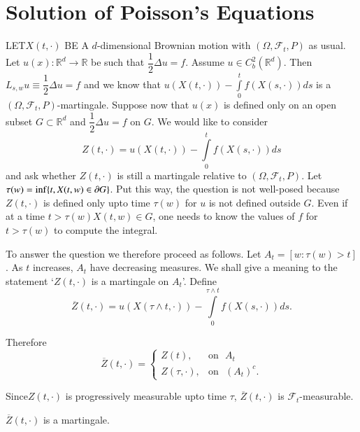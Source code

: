 \chapter{Solution of Poisson's Equations}\label{chap17}

LET\pageoriginale $X(t,\cdot)$ BE A $d$-dimensional Brownian motion
with $(\Omega,\mathscr{F}_{t},P)$ as usual. Let
$u(x):\mathbb{R}^{d}\to \mathbb{R}$ be such that $\dfrac{1}{2}\Delta
u=f$. Assume $u\in C^{2}_{b}(\mathbb{R}^{d})$. Then $L_{s,w}u\equiv
\dfrac{1}{2}\Delta u=f$ and we know that
$u(X(t,\cdot))-\int\limits^{t}_{0}f(X(s,\cdot))ds$ is a
$(\Omega,\mathscr{F}_{t},P)$-martingale. Suppose now that $u(x)$ is
defined only on an open subset $G\subset \mathbb{R}^{d}$ and
$\dfrac{1}{2}\Delta u=f$ on $G$. We would like to consider
$$
Z(t,\cdot)=u(X(t,\cdot))-\int\limits^{t}_{0}f(X(s,\cdot))ds
$$
and ask whether $Z(t,\cdot)$ is still a martingale relative to
$(\Omega,\mathscr{F}_{t},P)$. Let $\tau(w)=\inf\{t,X(t,w)\in \partial
G\}$. Put this way, the question is not well-posed because
$Z(t,\cdot)$ is defined only upto time $\tau(w)$ for $u$ is not
defined outside $G$. Even if at a time $t>\tau(w)X(t,w)\in G$, one
needs to know the values of $f$ for $t>\tau(w)$ to compute the
integral.

To answer the question we therefore proceed as follows. Let
$A_{t}=[w:\tau(w)>t]$. As $t$ increases, $A_{t}$ have decreasing
measures. We shall give a meaning to the statement `$Z(t,\cdot)$ is a
martingale on $A_{t}$'. Define
$$
\overline{Z}(t,\cdot)=u(X(\tau\wedge t,\cdot))-\int\limits^{\tau\wedge
  t}_{0}f(X(s,\cdot))ds.
$$

Therefore
$$
\overline{Z}(t,\cdot)
=
\begin{cases}
Z(t), & \text{on~ }A_{t}\\
Z(\tau,\cdot), &\text{on~ } (A_{t})^{c}.
\end{cases}
$$

Since\pageoriginale $Z(t,\cdot)$ is progressively measurable upto time
$\tau$, $\overline{Z}(t,\cdot)$ is $\mathscr{F}_{t}$-measurable.

\begin{theorem*}
$\overline{Z}(t,\cdot)$ is a martingale.
\end{theorem*}

